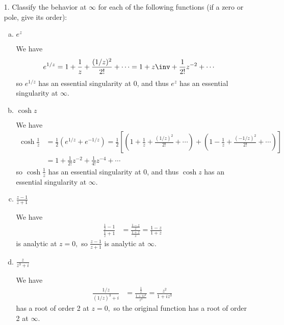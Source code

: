 \documentclass{article}
\begin{document}
\begin{itemize}
	\item[1.] Classify the behavior at $\infty$ for each of the following functions (if a zero or pole, give its order):
		\begin{enumerate}[(a)]
			\item $e^z$
				\begin{soln}
					We have
					\begin{align*}
						e^{1/z} &= 1 + \frac{1}{z} + \frac{(1/z)^2}{2!} + \cdots = 1 + z\inv + \frac{1}{2!}z^{-2} + \cdots
					\end{align*}
					so $e^{1/z}$ has an essential singularity at 0, and thus $e^z$ has an essential singularity at $\infty.$
				\end{soln}

			\item $\cosh z$
				\begin{soln}
					We have
					\begin{align*}
						\cosh \frac{1}{z} &= \frac{1}{2} \left( e^{1/z} + e^{-1/z} \right) = \frac{1}{2} \left[ \left( 1 + \frac{1}{z} + \frac{(1/z)^2}{2!} + \cdots \right) + \left( 1 - \frac{1}{z} + \frac{(-1/z)^2}{2!} + \cdots \right) \right] \\
						&= 1 + \frac{1}{2!}z^{-2} + \frac{1}{4!}z^{-4} + \cdots 
					\end{align*}
					so $\cosh \frac{1}{z}$ has an essential singularity at 0, and thus $\cosh z$ has an essential singularity at $\infty.$
				\end{soln}

			\item $\frac{z-1}{z+1}$
				\begin{soln}
					We have 
					\begin{align*}
						\frac{\frac{1}{z}-1}{\frac{1}{z}+1} &= \frac{\frac{1-z}{z}}{\frac{1+z}{z}} = \frac{1-z}{1+z} 
					\end{align*}
					is analytic at $z=0,$ so $\frac{z-1}{z+1}$ is analytic at $\infty.$
				\end{soln}

			\item $\frac{z}{z^3+i}$
				\begin{soln}
					We have
					\begin{align*}
						\frac{1/z}{(1/z)^3+i} &= \frac{\frac{1}{z}}{\frac{1+iz^3}{z^3}} = \frac{z^2}{1+iz^3}
					\end{align*}
					has a root of order 2 at $z=0,$ so the original function has a root of order 2 at $\infty.$
				\end{soln}


\end{enumerate}
\end{itemize}
\end{document}
